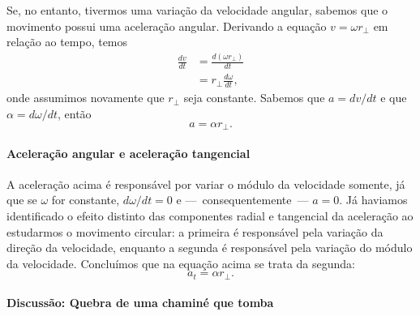 Se, no entanto, tivermos uma variação da velocidade angular, sabemos que o movimento possui uma aceleração angular. Derivando a equação $v = \omega r_\perp$ em relação ao tempo, temos
\begin{align}
	\frac{dv}{dt} &= \frac{d(\omega r_\perp)}{dt} \\
	&=r_\perp \frac{d\omega}{dt},
\end{align}
%
onde assumimos novamente que $r_\perp$ seja constante. Sabemos que $a=dv/dt$ e que $\alpha = d\omega/dt$, então
\begin{equation}
	a = \alpha r_\perp.
\end{equation}

\paragraph{Aceleração angular e aceleração tangencial}

A aceleração acima é responsável por variar o módulo da velocidade somente, já que se $\omega$ for constante, $d\omega/dt = 0$ e ---~consequentemente~--- $a=0$. Já haviamos identificado o efeito distinto das componentes radial e tangencial da aceleração ao estudarmos o movimento circular: a primeira é responsável pela variação da direção da velocidade, enquanto a segunda é responsável pela variação do módulo da velocidade. Concluímos que na equação acima se trata da segunda:
\begin{equation}
	a_t = \alpha r_\perp.
\end{equation}

\paragraph{Discussão: Quebra de uma chaminé que tomba}

